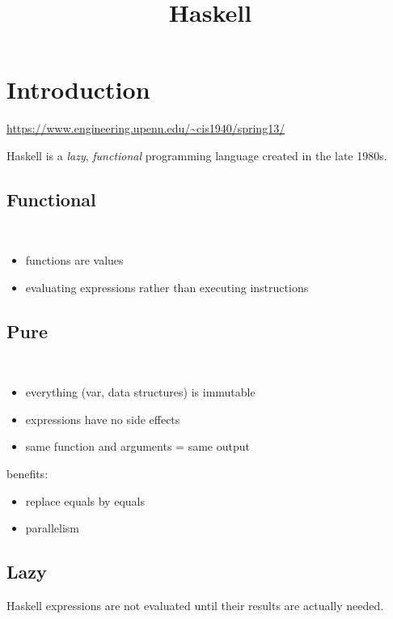 \documentclass{blog}
\title{Haskell}
\begin{document}
\maketitle
\tableofcontents
\section{Introduction}
\url{https://www.engineering.upenn.edu/~cis1940/spring13/}

Haskell is a \textit{lazy}, \textit{functional} programming language created in the late 1980s.

\subsection{Functional}
\begin{definition}[functional]~
    \begin{itemize}
        \item functions are values
        \item evaluating expressions rather than executing instructions
    \end{itemize}
\end{definition}

\subsection{Pure}
\begin{definition}~
    \begin{itemize}
        \item everything (var, data structures) is immutable
        \item expressions have no side effects
        \item same function and arguments = same output
    \end{itemize}
\end{definition}

benefits:
\begin{itemize}
    \item replace equals by equals
    \item parallelism
\end{itemize}

\subsection{Lazy}
\begin{definition}[lazy]
    Haskell expressions are not evaluated until their results are actually needed.
\end{definition}
\end{document}
